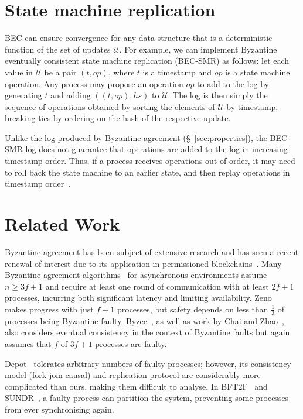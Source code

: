 \documentclass[a4paper,anonymous,USenglish]{lipics-v2019}
\begin{document}
\section{State machine replication}\label{sec:smr}

BEC can ensure convergence for any data structure that is a deterministic function of the set of updates $\mathcal{U}$.
For example, we can implement Byzantine eventually consistent state machine replication (BEC-SMR) as follows: let each value in $\mathcal{U}$ be a pair $(t, \mathit{op})$, where $t$ is a timestamp and $\mathit{op}$ is a state machine operation.
Any process may propose an operation $op$ to add to the log by generating $t$ and adding $((t, \mathit{op}), \mathit{hs})$ to $\mathcal{U}$.
The log is then simply the sequence of operations obtained by sorting the elements of $\mathcal{U}$ by timestamp, breaking ties by ordering on the hash of the respective update.

Unlike the log produced by Byzantine agreement (\S~\ref{sec:properties}), the BEC-SMR log does not guarantee that operations are added to the log in increasing timestamp order.
Thus, if a process receives operations out-of-order, it may need to roll back the state machine to an earlier state, and then replay operations in timestamp order~\cite{Jefferson:1985}.


\section{Related Work}

Byzantine agreement has been subject of extensive research and has seen a recent renewal of interest due to its application in permissioned blockchains~\cite{Bano:2019}.
Many Byzantine agreement algorithms~\cite{Castro:1999,Kotla:2007,Bessani:2014,Aublin:2015,Cowling:2006,Abd:2005} for asynchronous environments assume $n \ge 3f+1$ and require at least one round of communication with at least $2f+1$ processes, incurring both significant latency and limiting availability.
Zeno~\cite{Singh:2009} makes progress with just $f+1$ processes, but safety depends on less than $\frac{1}{3}$ of processes being Byzantine-faulty.
Byzec~\cite{Shoker:2017}, as well as work by Chai and Zhao~\cite{Chai:2014}, also considers eventual consistency in the context of Byzantine faults but again assumes that $f$ of $3f+1$ processes are faulty.

Depot~\cite{Mahajan:2011} tolerates arbitrary numbers of faulty processes; however, its consistency model (fork-join-causal) and replication protocol are considerably more complicated than ours, making them difficult to analyse.
In BFT2F~\cite{Li:2007} and SUNDR~\cite{Mazieres:2002}, a faulty process can partition the system, preventing some processes from ever synchronising again.
\end{document}
